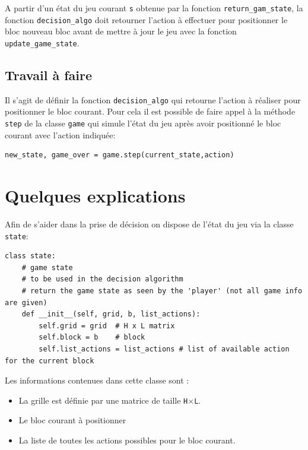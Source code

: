 \documentclass[10pt,a4paper]{article}
\begin{document}
A partir d'un état du jeu courant \texttt{s} obtenue par la fonction \texttt{return_gam_state}, la fonction \texttt{decision_algo} doit retourner l'action à effectuer pour positionner le bloc nouveau bloc avant de mettre à jour le jeu avec la fonction \texttt{update_game_state}.

\subsection*{Travail à faire}

Il s'agit de définir la fonction \texttt{decision_algo} qui retourne l'action à réaliser pour positionner le bloc courant. Pour cela il est possible de faire appel à la méthode \texttt{step} de la classe \texttt{game} qui simule l'état du jeu après avoir positionné le bloc courant avec l'action indiquée:
\begin{verbatim}
new_state, game_over = game.step(current_state,action)
\end{verbatim}

\section*{Quelques explications}

Afin de s'aider dans la prise de décision on dispose de l'état du jeu via la classe \texttt{state}:

\begin{verbatim}
class state:
	# game state 
	# to be used in the decision algorithm
	# return the game state as seen by the 'player' (not all game info are given)
	def __init__(self, grid, b, list_actions):
		self.grid = grid  # H x L matrix
		self.block = b    # block
		self.list_actions = list_actions # list of available action for the current block
\end{verbatim}

Les informations contenues dans cette classe sont :
\begin{itemize}
	\item La grille est définie par une matrice de taille \texttt{H}$\times$\texttt{L}.
	\item Le bloc courant à positionner
	\item La liste de toutes les actions possibles pour le bloc courant.
\end{itemize}
\medskip
\end{document}
